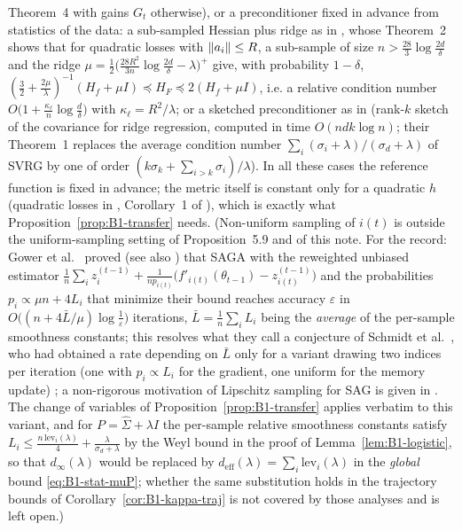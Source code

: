 Theorem~4 with gains $G_t$ otherwise), or a preconditioner fixed in advance from statistics of the data: a
sub-sampled Hessian plus ridge as in \cite{hendrikx2020statistically}, whose Theorem~2 shows that for
quadratic losses with $\left\|a_i\right\|\le R$, a sub-sample of size $n>\frac{28}{3}\log\frac{2d}{\delta}$ and the
ridge $\mu=\frac12\big(\frac{28R^2}{3n}\log\frac{2d}\delta-\lambda\big)^+$ give, with probability $1-\delta$,
$(\frac32+\frac{2\mu}{\lambda})^{-1}(H_f+\mu I)\preceq H_F\preceq2(H_f+\mu I)$, i.e. a relative condition
number $O\big(1+\frac{\kappa_\ell}{n}\log\frac d\delta\big)$ with $\kappa_\ell=R^2/\lambda$; or a sketched
preconditioner as in \cite{gonen2016solving} (rank-$k$ sketch of the covariance for ridge regression,
computed in time $O(ndk\log n)$; their Theorem~1 replaces the average condition number
$\sum_i(\sigma_i+\lambda)/(\sigma_d+\lambda)$ of SVRG by one of order $(k\sigma_k+\sum_{i>k}\sigma_i)/\lambda$).
In all these cases the reference function is fixed in advance; the metric itself is constant only for a
quadratic $h$ (quadratic losses in \cite{hendrikx2020statistically,gonen2016solving}, Corollary~1 of
\cite{dragomir2021fast}), which is exactly what Proposition~\ref{prop:B1-transfer} needs. (Non-uniform sampling
of $i(t)$ is outside the uniform-sampling setting of Proposition~5.9 and of this note. For the record: Gower
et al.\ \cite[Thm.~5.2 and Table~1, row~8]{gower2021stochastic} proved (see also \cite{qian2019saga}) that
SAGA with the reweighted unbiased estimator
$\frac1n\sum_iz_i^{(t-1)}+\frac1{np_{i(t)}}\big(f'_{i(t)}(\theta_{t-1})-z_{i(t)}^{(t-1)}\big)$ and the
probabilities $p_i\propto\mu n+4L_i$ that minimize their bound reaches accuracy $\varepsilon$ in
$O\big((n+4\bar L/\mu)\log\frac1\varepsilon\big)$ iterations, $\bar L=\frac1n\sum_iL_i$ being the
\emph{average} of the per-sample smoothness constants; this resolves what they call a conjecture of Schmidt
et al.\ \cite{schmidt2015nonuniform}, who had obtained a rate depending on $\bar L$ only for a variant drawing
two indices per iteration (one with $p_i\propto L_i$ for the gradient, one uniform for the memory update)
\cite[Prop.~1]{schmidt2015nonuniform}; a non-rigorous motivation of Lipschitz sampling for SAG is given in
\cite[Sec.~4.8]{schmidt2017minimizing}. The change of variables of
Proposition~\ref{prop:B1-transfer} applies verbatim to this variant, and for $P=\hat\Sigma+\lambda I$ the
per-sample relative smoothness constants satisfy $L_i\le\frac{n\,\mathrm{lev}_i(\lambda)}4+\frac{\lambda}{\sigma_d+\lambda}$
by the Weyl bound in the proof of Lemma~\ref{lem:B1-logistic}, so that $d_\infty(\lambda)$ would be replaced
by $d_{\mathrm{eff}}(\lambda)=\sum_i\mathrm{lev}_i(\lambda)$ in the \emph{global} bound \eqref{eq:B1-stat-muP};
whether the same substitution holds in the trajectory bounds of Corollary~\ref{cor:B1-kappa-traj} is not
covered by those analyses and is left open.)

